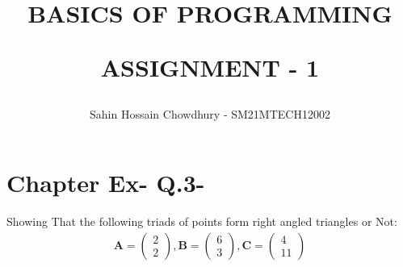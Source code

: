 \documentclass[journal,12pt,twocolumn]{IEEEtran}
\begin{document}
\newcommand{\myvec}[1]{\ensuremath{\begin{pmatrix}#1\end{pmatrix}}}
\newcommand{\cmyvec}[1]{\ensuremath{\begin{pmatrix*}[c]#1\end{pmatrix*}}}
\providecommand{\norm}[1]{\lVert#1\rVert}
\newcommand{\mydet}[1]{\ensuremath{\begin{vmatrix}#1\end{vmatrix}}}
\newcommand{\proj}[2]{\textbf{proj}_{\vec{#1}}\vec{#2}}
\newcommand{\abs}[1]{\left\lvert#1\right\rvert}
\newcommand{\RNum}[1]{\uppercase\expandafter{\romannumeral #1\relax}}
\newcommand{\Rnum}[1]{\lowercase\expandafter{\romannumeral #1\relax}}
\let\StandardTheFigure\thefigure
\let\vec\mathbf

\title{
BASICS OF PROGRAMMING

ASSIGNMENT - 1
}
\author{ Sahin Hossain Chowdhury - SM21MTECH12002}
\maketitle
\newpage
\bigskip
\renewcommand{\thefigure}{\theenumi}

\section*{ Chapter \RNum{2} Ex-\RNum{2} Q.3-\Rnum{2}}
\noindent

Showing That the following triads of points form right angled triangles or Not:
\begin{align}
\vec{A} = \myvec{2\\2}, \vec{B} =\myvec{6\\3},
\vec{C} =\myvec{4\\11}
\end{align}
\noindent
\end{document}
